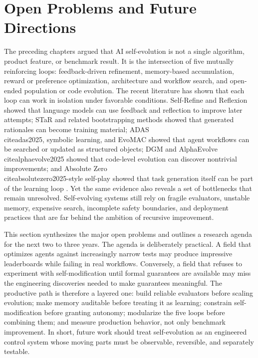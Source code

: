 \section{Open Problems and Future Directions}
\label{sec:open-problems-future-directions}

The preceding chapters argued that AI self-evolution is not a single algorithm, product feature, or benchmark result. It is the intersection of five mutually reinforcing loops: feedback-driven refinement, memory-based accumulation, reward or preference optimization, architecture and workflow search, and open-ended population or code evolution. The recent literature has shown that each loop can work in isolation under favorable conditions. Self-Refine and Reflexion showed that language models can use feedback and reflection to improve later attempts; STaR and related bootstrapping methods showed that generated rationales can become training material; ADAS \\cite{adas2025}, symbolic learning, and EvoMAC showed that agent workflows can be searched or updated as structured objects; DGM and AlphaEvolve \\cite{alphaevolve2025} showed that code-level evolution can discover nontrivial improvements; and Absolute Zero \\cite{absolutezero2025}-style self-play showed that task generation itself can be part of the learning loop \cite{star2022,selfrefine2023,reflexion2023,adas2025,darwingodelmachine2025,alphaevolve2025,absolutezero2025}. Yet the same evidence also reveals a set of bottlenecks that remain unresolved. Self-evolving systems still rely on fragile evaluators, unstable memory, expensive search, incomplete safety boundaries, and deployment practices that are far behind the ambition of recursive improvement.

This section synthesizes the major open problems and outlines a research agenda for the next two to three years. The agenda is deliberately practical. A field that optimizes agents against increasingly narrow tests may produce impressive leaderboards while failing in real workflows. Conversely, a field that refuses to experiment with self-modification until formal guarantees are available may miss the engineering discoveries needed to make guarantees meaningful. The productive path is therefore a layered one: build reliable evaluators before scaling evolution; make memory auditable before treating it as learning; constrain self-modification before granting autonomy; modularize the five loops before combining them; and measure production behavior, not only benchmark improvement. In short, future work should treat self-evolution as an engineered control system whose moving parts must be observable, reversible, and separately testable.

